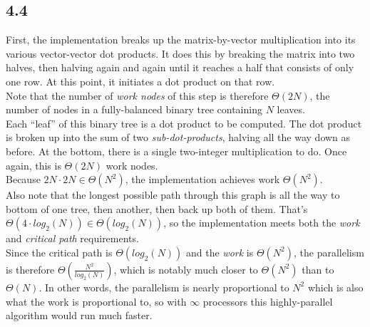 \documentclass[11pt, letterpaper]{article}
\begin{document}
\subsection*{4.4}
First, the implementation breaks up the matrix-by-vector multiplication into its various vector-vector dot products. It does this by breaking the matrix into two halves, then halving again and again until it reaches a half that consists of only one row. At this point, it initiates a dot product on that row.\\

Note that the number of \textit{work nodes} of this step is therefore $\Theta(2N)$, the number of nodes in a fully-balanced binary tree containing $N$ leaves.\\

Each ``leaf'' of this binary tree is a dot product to be computed. The dot product is broken up into the sum of two \textit{sub-dot-products}, halving all the way down as before. At the bottom, there is a single two-integer multiplication to do. Once again, this is $\Theta(2N)$ work nodes.\\

Because $2N \cdot 2N \in \Theta(N^2)$, the implementation achieves work $\Theta(N^2)$.\\

Also note that the longest possible path through this graph is all the way to bottom of one tree, then another, then back up both of them. That's $\Theta(4 \cdot log_2(N)) \in \Theta(log_2(N))$, so the implementation meets both the \textit{work} and \textit{critical path} requirements.\\

Since the critical path is $\Theta(log_2(N))$ and the \textit{work} is $\Theta(N^2)$, the parallelism is therefore $\Theta(\frac{N^2}{log_2(N)})$, which is notably much closer to $\Theta(N^2)$ than to $\Theta(N)$. In other words, the parallelism is nearly proportional to $N^2$ which is also what the work is proportional to, so with $\infty$ processors this highly-parallel algorithm would run much faster.
\end{document}
